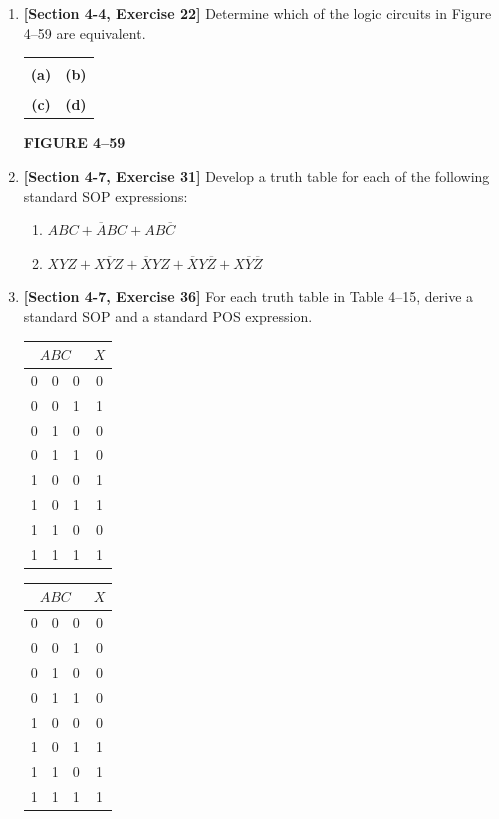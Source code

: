 \documentclass[11pt]{article}
\begin{document}
\begin{enumerate}
\item \textbf{[Section 4-4, Exercise 22]}
Determine which of the logic circuits in Figure 4--59 are equivalent.

\begin{center}
\begin{tabular}{cc}
 &
 \\
\textbf{(a)} & \textbf{(b)} \\[0.18cm]
 &
 \\
\textbf{(c)} & \textbf{(d)}
\end{tabular}

\vspace{0.08cm}
\textbf{FIGURE 4--59}
\end{center}

\item \textbf{[Section 4-7, Exercise 31]}
Develop a truth table for each of the following standard SOP expressions:
\begin{enumerate}[label=(\alph*)]
    \item $ABC+\overline{A}BC+AB\overline{C}$
    \item $XYZ+X\overline{Y}Z+\overline{X}YZ+\overline{X}Y\overline{Z}
          +X\overline{Y}\overline{Z}$
\end{enumerate}

\item \textbf{[Section 4-7, Exercise 36]}
For each truth table in Table 4--15, derive a standard SOP and a standard POS expression.

\begin{center}
\scriptsize
\renewcommand{\arraystretch}{1.10}

\begin{tabular}{c c c|c}
\multicolumn{3}{c|}{$ABC$} & $X$\\ \hline
0&0&0&0\\0&0&1&1\\0&1&0&0\\0&1&1&0\\
1&0&0&1\\1&0&1&1\\1&1&0&0\\1&1&1&1
\end{tabular}
\hspace{0.25cm}
\begin{tabular}{c c c|c}
\multicolumn{3}{c|}{$ABC$} & $X$\\ \hline
0&0&0&0\\0&0&1&0\\0&1&0&0\\0&1&1&0\\
1&0&0&0\\1&0&1&1\\1&1&0&1\\1&1&1&1
\end{tabular}


\end{center}
\end{enumerate}
\end{document}
